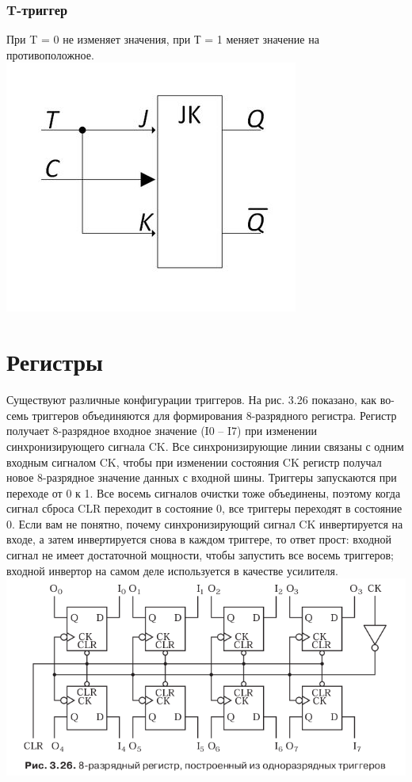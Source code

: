 \documentclass[12pt, a4paper]{article}
\begin{document}
\subsubsection{T-триггер}
При T = 0 не изменяет значения, при Т = 1 меняет значение на противоположное.\\
\includegraphics[scale=0.6]{./images/T.jpg}\\
\section{Регистры}
Существуют различные конфигурации триггеров. На рис. 3.26 показано, как во-
семь триггеров объединяются для формирования 8-разрядного регистра. Регистр
получает 8-разрядное входное значение (I0 – I7) при изменении синхронизирующего сигнала CK. Все синхронизирующие линии связаны с одним входным
сигналом CK, чтобы при изменении состояния CK регистр получал новое 8-разрядное значение данных с входной шины. Триггеры запускаются при переходе от 0 к 1. Все восемь сигналов очистки тоже объединены, поэтому когда сигнал сброса CLR переходит в состояние 0, все триггеры переходят в состояние 0. Если вам не понятно, почему синхронизирующий сигнал CK инвертируется на входе, а затем инвертируется снова в каждом триггере, то ответ прост: входной сигнал не имеет достаточной мощности, чтобы запустить все восемь триггеров; входной инвертор на самом деле используется в качестве усилителя.\\
\includegraphics[scale=0.6]{./images/3_26.png}
\end{document}
